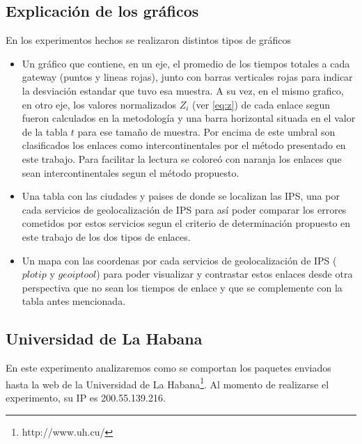 \subsection{Explicación de los gráficos}

En los experimentos hechos se realizaron distintos tipos de gráficos

\begin{itemize}
	\item Un gráfico que contiene, en un eje, el promedio de los tiempos totales
	a cada gateway (puntos y lineas rojas), junto con barras verticales rojas
	para indicar la desviación estandar que tuvo esa muestra. A su vez, en el
	mismo grafico, en otro eje, los valores normalizados $Z_{i}$ (ver
	\ref{eq:z}) de cada enlace segun fueron calculados en la metodología y una
	barra horizontal situada en el valor de la tabla $t$ para ese tamaño de
	muestra.  Por encima de este umbral son clasificados los enlaces como
	intercontinentales por el método presentado en este trabajo.  Para
	facilitar la lectura se coloreó con naranja los enlaces que sean
	intercontinentales segun el método propuesto.

	\item Una tabla con las ciudades y paises de donde se localizan las IPS,
	una por cada servicios de geolocalización de IPS para así poder comparar
	los errores cometidos por estos servicios segun el criterio de
	determinación propuesto en este trabajo de los dos tipos de enlaces.

	\item Un mapa con las coordenas por cada servicios de geolocalización de
	IPS ($plotip$ y $geoiptool$) para poder visualizar y contrastar estos
	enlaces desde otra perspectiva que no sean los tiempos de enlace y que
	se complemente con la tabla antes mencionada.
\end{itemize}



\subsection{Universidad de La Habana}

En este experimento analizaremos como se comportan los paquetes enviados hasta
la web de la Universidad de La Habana\footnote{http://www.uh.cu/}. Al momento
de realizarse el experimento, su IP es 200.55.139.216.

